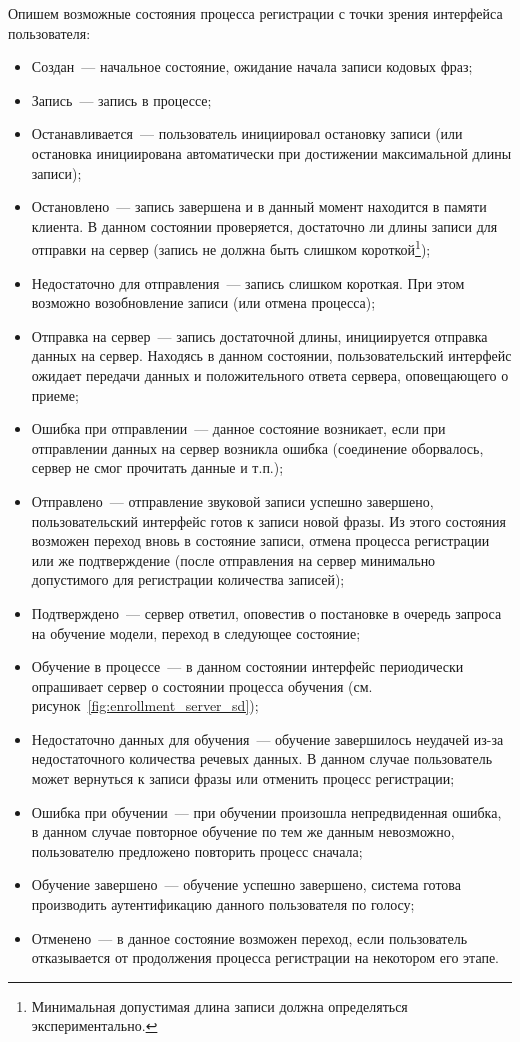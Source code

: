 Опишем возможные состояния процесса регистрации с точки зрения интерфейса
пользователя:

\begin{itemize}
\item Создан~--- начальное состояние, ожидание начала записи кодовых фраз;
\item Запись~--- запись в процессе;
\item Останавливается~--- пользователь инициировал остановку записи (или
остановка инициирована автоматически при достижении максимальной длины записи);
\item Остановлено~--- запись завершена и в данный момент находится в памяти
клиента. В данном состоянии проверяется, достаточно ли длины записи для отправки
на сервер (запись не должна быть слишком короткой\footnote{Минимальная
допустимая длина записи должна определяться экспериментально.});
\item Недостаточно для отправления~--- запись слишком короткая. При этом
возможно возобновление записи (или отмена процесса);
\item Отправка на сервер~--- запись достаточной длины, инициируется отправка
данных на сервер. Находясь в данном состоянии, пользовательский интерфейс
ожидает передачи данных и положительного ответа сервера, оповещающего о приеме;
\item Ошибка при отправлении~--- данное состояние возникает, если при
отправлении данных на сервер возникла ошибка (соединение оборвалось, сервер не
смог прочитать данные и т.п.);
\item Отправлено~--- отправление звуковой записи успешно завершено,
пользовательский интерфейс готов к записи новой фразы. Из этого состояния
возможен переход вновь в состояние записи, отмена процесса регистрации или же
подтверждение (после отправления на сервер минимально допустимого для
регистрации количества записей);
\item Подтверждено~--- сервер ответил, оповестив о постановке в очередь запроса
на обучение модели, переход в следующее состояние;
\item Обучение в процессе~--- в данном состоянии интерфейс периодически
опрашивает сервер о состоянии процесса обучения (см.
рисунок~\ref{fig:enrollment_server_sd});
\item Недостаточно данных для обучения~--- обучение завершилось неудачей из-за
недостаточного количества речевых данных. В данном случае пользователь может
вернуться к записи фразы или отменить процесс регистрации;
\item Ошибка при обучении~--- при обучении произошла непредвиденная ошибка, в
данном случае повторное обучение по тем же данным невозможно, пользователю
предложено повторить процесс сначала;
\item Обучение завершено~--- обучение успешно завершено, система готова
производить аутентификацию данного пользователя по голосу;
\item Отменено~--- в данное состояние возможен переход, если пользователь
отказывается от продолжения процесса регистрации на некотором его этапе.
\end{itemize}

